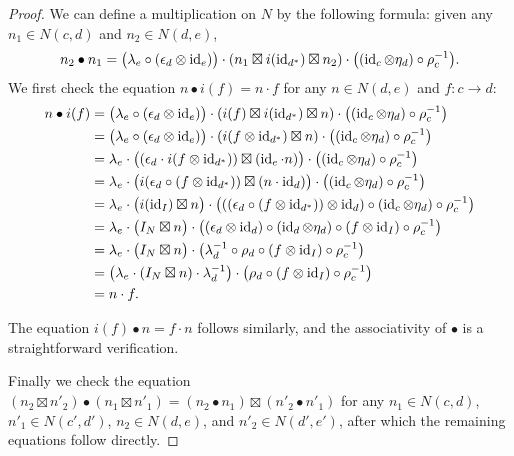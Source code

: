 \documentclass[12pt,oneside,article,draft]{memoir}
\begin{document}
\begin{proof}
   We can define a multiplication on $N$ by the following formula: given any $n_1\in N(c,d)$ and $n_2\in N(d,e)$,
   \[
      n_2\bullet n_1 = \bigl(\lambda_e\circ(\epsilon_d\otimes\operatorname{id}_e)\bigr)\cdot(n_1\boxtimes i(\operatorname{id}_{d^*})\boxtimes n_2)\cdot\bigl((\operatorname{id}_c\otimes \eta_d)\circ\rho_c^{-1}\bigr).
   \]
   We first check the equation $n\bullet i(f)=n\cdot f$ for any $n\in N(d,e)$ and $f\colon c\to d$:
   \begin{align*}
      n\bullet i(f) &= \bigl(\lambda_e\circ(\epsilon_d\otimes\operatorname{id}_e)\bigr)\cdot(i(f)\boxtimes i(\operatorname{id}_{d^*})\boxtimes n)\cdot\bigl((\operatorname{id}_c\otimes \eta_d)\circ\rho_c^{-1}\bigr) \\
      &= \bigl(\lambda_e\circ(\epsilon_d\otimes\operatorname{id}_e)\bigr)\cdot(i(f\otimes\operatorname{id}_{d^*})\boxtimes n)\cdot\bigl((\operatorname{id}_c\otimes \eta_d)\circ\rho_c^{-1}\bigr) \\
      &= \lambda_e\cdot\bigl((\epsilon_d\cdot i(f\otimes \operatorname{id}_{d^*}))\boxtimes (\operatorname{id}_e\cdot n)\bigr)\cdot\bigl((\operatorname{id}_c\otimes \eta_d)\circ\rho_c^{-1}\bigr) \\
      &= \lambda_e\cdot\bigl(i(\epsilon_d\circ (f\otimes \operatorname{id}_{d^*}))\boxtimes (n\cdot\operatorname{id}_d)\bigr)\cdot\bigl((\operatorname{id}_c\otimes \eta_d)\circ\rho_c^{-1}\bigr) \\
      &= \lambda_e\cdot\bigl(i(\operatorname{id}_I)\boxtimes n\bigr)\cdot\bigl(((\epsilon_d\circ (f\otimes \operatorname{id}_{d^*}))\otimes\operatorname{id}_d)\circ(\operatorname{id}_c\otimes \eta_d)\circ\rho_c^{-1}\bigr) \\
      &= \lambda_e\cdot\bigl(I_N\boxtimes n\bigr)\cdot\bigl((\epsilon_d\otimes\operatorname{id}_d)\circ(\operatorname{id}_d\otimes\eta_d)\circ(f\otimes\operatorname{id}_I)\circ\rho_c^{-1}\bigr) \\
      &= \lambda_e\cdot\bigl(I_N\boxtimes n\bigr)\cdot\bigl(\lambda_d^{-1}\circ\rho_d\circ(f\otimes\operatorname{id}_I)\circ\rho_c^{-1}\bigr) \\
      &= \bigl(\lambda_e\cdot(I_N\boxtimes n)\cdot\lambda_d^{-1}\bigr)\cdot\bigl(\rho_d\circ(f\otimes\operatorname{id}_I)\circ\rho_c^{-1}\bigr) \\
      &= n\cdot f.
   \end{align*}

   The equation $i(f)\bullet n=f\cdot n$ follows similarly, and the associativity of $\bullet$ is a straightforward verification.

   Finally we check the equation $(n_2\boxtimes n'_2)\bullet(n_1\boxtimes n'_1)=(n_2\bullet n_1)\boxtimes(n'_2\bullet n'_1)$ for any $n_1\in N(c,d)$, $n'_1\in N(c',d')$, $n_2\in N(d,e)$, and $n'_2\in N(d',e')$, after which the remaining equations follow directly.


\end{proof}
\end{document}
